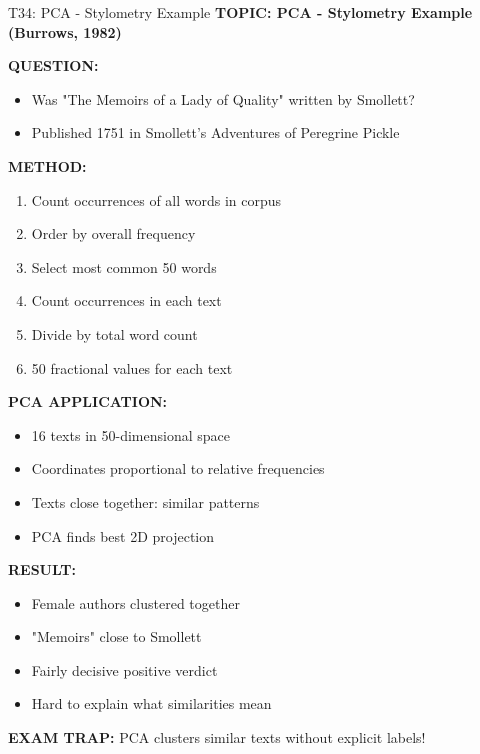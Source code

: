 \documentclass[8pt]{beamer}
\begin{document}
	\begin{frame}{T34: PCA - Stylometry Example}
		\fontsize{6.5}{7.5}\selectfont
		\textbf{TOPIC: PCA - Stylometry Example (Burrows, 1982)}
		
		\vspace{0.1cm}
		\textbf{QUESTION:}
		\begin{itemize}
			\item Was "The Memoirs of a Lady of Quality" written by Smollett?
			\item Published 1751 in Smollett's Adventures of Peregrine Pickle
		\end{itemize}
		
		\vspace{0.1cm}
		\textbf{METHOD:}
		\begin{enumerate}
			\item Count occurrences of all words in corpus
			\item Order by overall frequency
			\item Select most common 50 words
			\item Count occurrences in each text
			\item Divide by total word count
			\item 50 fractional values for each text
		\end{enumerate}
		
		\vspace{0.1cm}
		\textbf{PCA APPLICATION:}
		\begin{itemize}
			\item 16 texts in 50-dimensional space
			\item Coordinates proportional to relative frequencies
			\item Texts close together: similar patterns
			\item PCA finds best 2D projection
		\end{itemize}
		
		\vspace{0.1cm}
		\textbf{RESULT:}
		\begin{itemize}
			\item Female authors clustered together
			\item "Memoirs" close to Smollett
			\item Fairly decisive positive verdict
			\item Hard to explain what similarities mean
		\end{itemize}
		
		\textcolor{myred}{\textbf{EXAM TRAP:}} PCA clusters similar texts \textcolor{myblue}{without explicit labels}!
	\end{frame}
	
\end{document}
